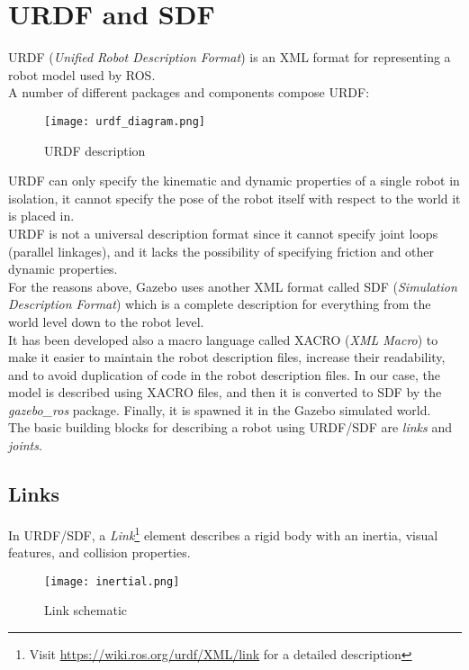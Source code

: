\section{URDF and SDF}
URDF (\textit{Unified Robot Description Format}) is an XML format for representing a robot model used by ROS. \\
A number of different packages and components compose URDF: \\

\begin{figure}[H]
    \texttt{[image: urdf\_diagram.png]}
    \caption{URDF description}
\end{figure}

URDF can only specify the kinematic and dynamic properties of a single robot in isolation, it cannot specify the pose 
of the robot itself with respect to the world it is placed in.\\
URDF is not a universal description format since it cannot specify joint loops (parallel linkages), and it lacks the possibility 
of specifying friction and other dynamic properties.\\
For the reasons above, Gazebo uses another XML format called SDF (\textit{Simulation Description Format}) which 
is a complete description for everything from the world level down to the robot level.\\ 
It has been developed also a macro language called XACRO (\textit{XML Macro}) to make it easier to maintain the robot description 
files, increase their readability, and to avoid duplication of code in the robot description files.
In our case, the model is described using XACRO files, and then it is converted to SDF by the \textit{gazebo\_ros} package.
Finally, it is spawned it in the Gazebo simulated world. \\
The basic building blocks for describing a robot using URDF/SDF are \textit{links} and \textit{joints}.

\subsection{Links}
In URDF/SDF, a \textit{Link}\footnote{Visit \url{https://wiki.ros.org/urdf/XML/link} for a detailed description} 
element describes a rigid body with an inertia, visual features, and collision properties. \\

\begin{figure}[H]
    \centering
    \texttt{[image: inertial.png]}
    \caption{Link schematic}
\end{figure}

